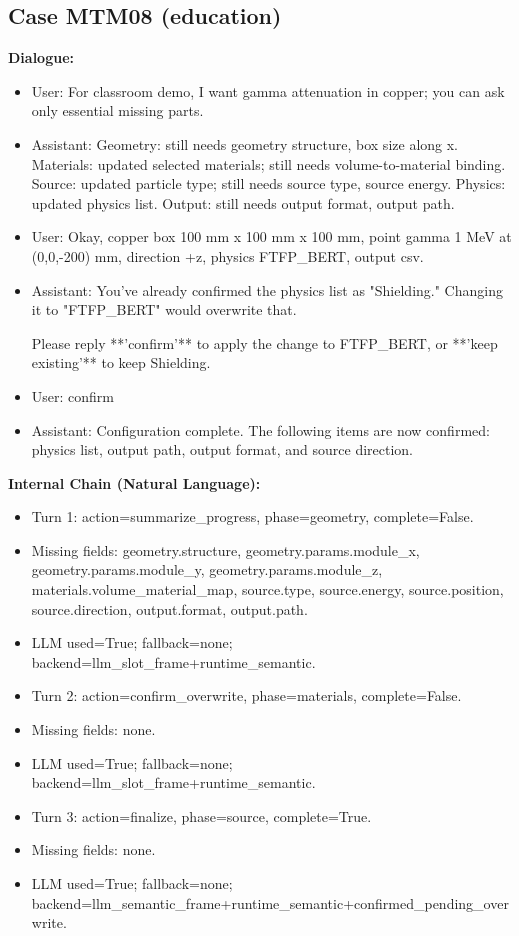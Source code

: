 \documentclass[11pt]{ctexart}
\begin{document}
\subsection{Case MTM08 (education)}
\textbf{Dialogue:}
\begin{itemize}
\item User: For classroom demo, I want gamma attenuation in copper; you can ask only essential missing parts.
\item Assistant: Geometry: still needs geometry structure, box size along x. Materials: updated selected materials; still needs volume-to-material binding. Source: updated particle type; still needs source type, source energy. Physics: updated physics list. Output: still needs output format, output path.
\item User: Okay, copper box 100 mm x 100 mm x 100 mm, point gamma 1 MeV at (0,0,-200) mm, direction +z, physics FTFP\_BERT, output csv.
\item Assistant: You've already confirmed the physics list as "Shielding." Changing it to "FTFP\_BERT" would overwrite that.

Please reply **'confirm'** to apply the change to FTFP\_BERT, or **'keep existing'** to keep Shielding.
\item User: confirm
\item Assistant: Configuration complete. The following items are now confirmed: physics list, output path, output format, and source direction.
\end{itemize}
\textbf{Internal Chain (Natural Language):}
\begin{itemize}
\item Turn 1: action=summarize\_progress, phase=geometry, complete=False.
\item Missing fields: geometry.structure, geometry.params.module\_x, geometry.params.module\_y, geometry.params.module\_z, materials.volume\_material\_map, source.type, source.energy, source.position, source.direction, output.format, output.path.
\item LLM used=True; fallback=none; backend=llm\_slot\_frame+runtime\_semantic.
\item Turn 2: action=confirm\_overwrite, phase=materials, complete=False.
\item Missing fields: none.
\item LLM used=True; fallback=none; backend=llm\_slot\_frame+runtime\_semantic.
\item Turn 3: action=finalize, phase=source, complete=True.
\item Missing fields: none.
\item LLM used=True; fallback=none; backend=llm\_semantic\_frame+runtime\_semantic+confirmed\_pending\_overwrite.
\end{itemize}
\end{document}
